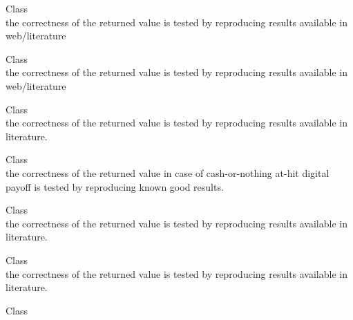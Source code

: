 \begin{DoxyRefList}
\item[Class \doxylink{class_quant_lib_1_1_longstaff_schwartz_path_pricer}{Quant\+Lib\+::Longstaff\+Schwartz\+Path\+Pricer\texorpdfstring{$<$}{<} Path\+Type \texorpdfstring{$>$}{>}} ]\hfill \\
\label{test__test000083}%
%
the correctness of the returned value is tested by reproducing results available in web/literature  
\item[Class \doxylink{class_quant_lib_1_1_m_c_american_engine}{Quant\+Lib\+::MCAmerican\+Engine\texorpdfstring{$<$}{<} RNG, S, RNG\+\_\+\+Calibration \texorpdfstring{$>$}{>}} ]\hfill \\
\label{test__test000156}%
%
the correctness of the returned value is tested by reproducing results available in web/literature  
\item[Class \doxylink{class_quant_lib_1_1_m_c_barrier_engine}{Quant\+Lib\+::MCBarrier\+Engine\texorpdfstring{$<$}{<} RNG, S \texorpdfstring{$>$}{>}} ]\hfill \\
\label{test__test000109}%
%
the correctness of the returned value is tested by reproducing results available in literature.  
\item[Class \doxylink{class_quant_lib_1_1_m_c_digital_engine}{Quant\+Lib\+::MCDigital\+Engine\texorpdfstring{$<$}{<} RNG, S \texorpdfstring{$>$}{>}} ]\hfill \\
\label{test__test000157}%
%
the correctness of the returned value in case of cash-\/or-\/nothing at-\/hit digital payoff is tested by reproducing known good results.  
\item[Class \doxylink{class_quant_lib_1_1_m_c_discrete_arithmetic_a_p_engine}{Quant\+Lib\+::MCDiscrete\+Arithmetic\+APEngine\texorpdfstring{$<$}{<} RNG, S \texorpdfstring{$>$}{>}} ]\hfill \\
\label{test__test000096}%
%
the correctness of the returned value is tested by reproducing results available in literature.  
\item[Class \doxylink{class_quant_lib_1_1_m_c_discrete_arithmetic_a_p_heston_engine}{Quant\+Lib\+::MCDiscrete\+Arithmetic\+APHeston\+Engine\texorpdfstring{$<$}{<} RNG, S, P \texorpdfstring{$>$}{>}} ]\hfill \\
\label{test__test000097}%
%
the correctness of the returned value is tested by reproducing results available in literature.  
\item[Class \doxylink{class_quant_lib_1_1_m_c_discrete_geometric_a_p_engine}{Quant\+Lib\+::MCDiscrete\+Geometric\+APEngine\texorpdfstring{$<$}{<} RNG, S \texorpdfstring{$>$}{>}} ]\hfill \\

\end{DoxyRefList}
